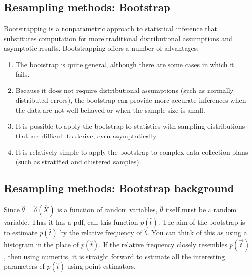 \subsection*{Resampling methods: Bootstrap}

\paragraph{}
Bootstrapping is a nonparametric approach to statistical inference
that substitutes computation for more traditional distributional
assumptions and asymptotic results. Bootstrapping offers a number of
advantages: 
\begin{enumerate}
\item The bootstrap is quite general, although there are some cases in which it fails.  

\item Because it does not require distributional assumptions (such as normally distributed errors), the bootstrap can provide more accurate inferences when the data are not well behaved or when the sample size is small.  

\item It is possible to apply the bootstrap to statistics with sampling distributions that are difficult to derive, even asymptotically. 

\item It is relatively simple to apply the bootstrap to complex data-collection plans (such as stratified and clustered samples).
\end{enumerate}

\noindent



\subsection*{Resampling methods: Bootstrap background}

Since $\widehat{\theta} = \widehat{\theta}(\hat{X})$ is a function of random variables,
$\widehat{\theta}$ itself must be a random variable. Thus it has
a pdf, call this function $p(\hat{t})$. The aim of the bootstrap is to
estimate $p(\hat{t})$ by the relative frequency of
$\widehat{\theta}$. You can think of this as using a histogram
in the place of $p(\hat{t})$. If the relative frequency closely
resembles $p(\vec{t})$, then using numerics, it is straight forward to
estimate all the interesting parameters of $p(\hat{t})$ using point
estimators.  


